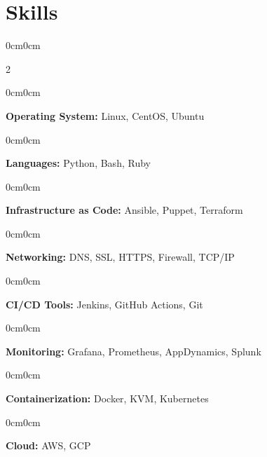 \documentclass[10pt, letterpaper]{article}
\newenvironment{onecolentry}{
    \begin{adjustwidth}{0cm}{0cm}
}{
    \end{adjustwidth}
} %
\newenvironment{twocolentry}[2][]{
    \onecolentry
    \def\secondColumn{#2}
    \setcolumnwidth{\fill, 9 cm}
    \begin{paracol}{2}
}{
    \switchcolumn \raggedleft \secondColumn
    \end{paracol}
    \endonecolentry
} %
\begin{document}
    \section{Skills}

        \begin{twocolentry}{

            \begin{onecolentry}
                \textbf{CI/CD Tools:} Jenkins, GitHub Actions, Git
            \end{onecolentry}
            \vspace{0.2 cm}

            \begin{onecolentry}
                \textbf{Monitoring:} Grafana, Prometheus, AppDynamics, Splunk
            \end{onecolentry}
            \vspace{0.2 cm}

            \begin{onecolentry}
                \textbf{Containerization:} Docker, KVM, Kubernetes
            \end{onecolentry}
            \vspace{0.2 cm}

            \begin{onecolentry}
                \textbf{Cloud:} AWS, GCP
            \end{onecolentry}
            \vspace{0.2 cm}

        }
        \begin{onecolentry}
        \textbf{Operating System:} Linux, CentOS, Ubuntu
        \end{onecolentry}
        \vspace{0.2 cm}

        \begin{onecolentry}
        \textbf{Languages:} Python, Bash, Ruby
        \end{onecolentry}
        \vspace{0.2 cm}

        \begin{onecolentry}
        \textbf{Infrastructure as Code:} Ansible, Puppet, Terraform
        \end{onecolentry}
        \vspace{0.2 cm}

        \begin{onecolentry}
        \textbf{Networking:} DNS, SSL, HTTPS, Firewall, TCP/IP
        \end{onecolentry}
        \vspace{0.2 cm}

        \end{twocolentry}
\end{document}

